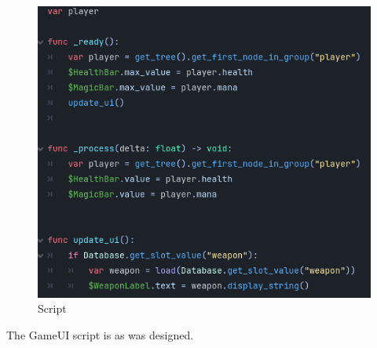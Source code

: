\documentclass{article}
\begin{document}
        \begin{figure}[H]
                \centering
                \includegraphics[width = 0.8\columnwidth]{images/development/GameUI_script.PNG}
                \caption{Script}
        \end{figure}
        The GameUI script is as was designed.\\
\end{document}
